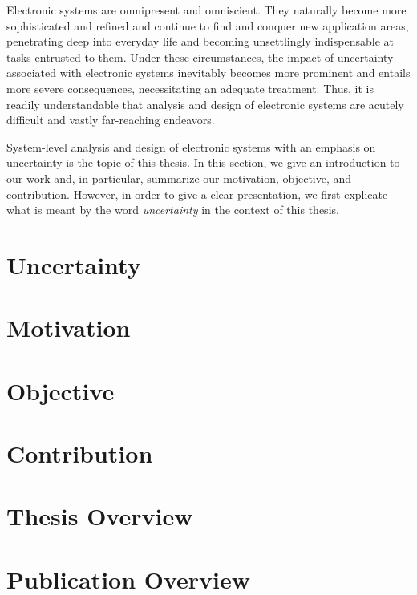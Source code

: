 Electronic systems are omnipresent and omniscient. They naturally become more
sophisticated and refined and continue to find and conquer new application
areas, penetrating deep into everyday life and becoming unsettlingly
indispensable at tasks entrusted to them. Under these circumstances, the impact
of uncertainty associated with electronic systems inevitably becomes more
prominent and entails more severe consequences, necessitating an adequate
treatment. Thus, it is readily understandable that analysis and design of
electronic systems are acutely difficult and vastly far-reaching endeavors.

System-level analysis and design of electronic systems with an emphasis on
uncertainty is the topic of this thesis. In this section, we give an
introduction to our work and, in particular, summarize our motivation,
objective, and contribution. However, in order to give a clear presentation, we
first explicate what is meant by the word \emph{uncertainty} in the context of
this thesis.

\section{Uncertainty}

\section{Motivation}

\section{Objective}

\section{Contribution}

\section{\priortitle}

\section{Thesis Overview}

\section{Publication Overview}
